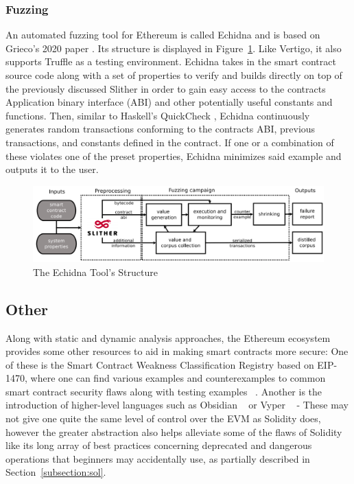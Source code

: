\documentclass[letterpaper,twocolumn,10pt]{article}
\begin{document}
\subsubsection{Fuzzing}

An automated fuzzing tool for Ethereum is called Echidna and is based on Grieco's 2020 paper \cite{grieco_song_cygan_feist_groce_2020}. Its structure is displayed in Figure~\ref{fig:echidna}. Like Vertigo, it also supports Truffle as a testing environment. Echidna takes in the smart contract source code along with a set of properties to verify and builds directly on top of the previously discussed Slither in order to gain easy access to the contracts Application binary interface (ABI) and other potentially useful constants and functions. Then, similar to Haskell's QuickCheck \cite{claessen_hughes_2000}, Echidna continuously generates random transactions conforming to the contracts ABI, previous transactions, and constants defined in the contract. If one or a combination of these violates one of the preset properties, Echidna minimizes said example and outputs it to the user.
\begin{figure}
\begin{center}
\includegraphics[scale=0.16]{echidna}
\end{center}
\caption{\label{fig:echidna} The Echidna Tool's Structure\cite{grieco_song_cygan_feist_groce_2020}}
\end{figure}

\subsection{Other}
Along with static and dynamic analysis approaches, the Ethereum ecosystem provides some other resources to aid in making smart contracts more secure: One of these is the Smart Contract Weakness Classification Registry based on EIP-1470, where one can find various examples and counterexamples to common smart contract security flaws along with testing examples ~\cite{SWC}. Another is the introduction of higher-level languages such as Obsidian ~\cite{7965268} or Vyper ~\cite{9223278} - These may not give one quite the same level of control over the EVM as Solidity does, however the greater abstraction also helps alleviate some of the flaws of Solidity like its long array of best practices concerning deprecated and dangerous operations that beginners may accidentally use, as partially described in Section~\ref{subsection:sol}.
\end{document}
